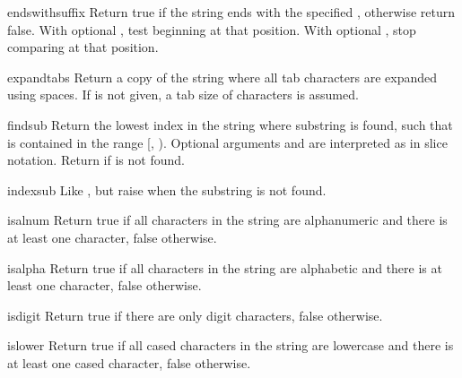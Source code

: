 \begin{methoddesc}[string]{endswith}{suffix}
Return true if the string ends with the specified ,
otherwise return false.  With optional , test beginning at
that position.  With optional , stop comparing at that position.
\end{methoddesc}

\begin{methoddesc}[string]{expandtabs}{}
Return a copy of the string where all tab characters are expanded
using spaces.  If  is not given, a tab size of 
characters is assumed.
\end{methoddesc}

\begin{methoddesc}[string]{find}{sub}
Return the lowest index in the string where substring  is
found, such that  is contained in the range [,
).  Optional arguments  and  are
interpreted as in slice notation.  Return  if  is
not found.
\end{methoddesc}

\begin{methoddesc}[string]{index}{sub}
Like , but raise  when the
substring is not found.
\end{methoddesc}

\begin{methoddesc}[string]{isalnum}{}
Return true if all characters in the string are alphanumeric and there
is at least one character, false otherwise.
\end{methoddesc}

\begin{methoddesc}[string]{isalpha}{}
Return true if all characters in the string are alphabetic and there
is at least one character, false otherwise.
\end{methoddesc}

\begin{methoddesc}[string]{isdigit}{}
Return true if there are only digit characters, false otherwise.
\end{methoddesc}

\begin{methoddesc}[string]{islower}{}
Return true if all cased characters in the string are lowercase and
there is at least one cased character, false otherwise.
\end{methoddesc}

